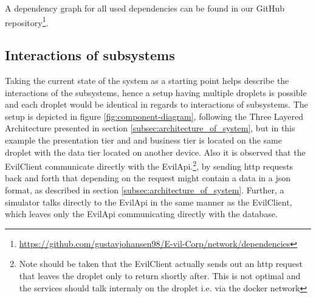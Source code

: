 \documentclass[report/main.tex]{subfiles}
\begin{document}
        A dependency graph for all used dependencies can be found in our GitHub repository\footnote{\hyperlink{Dependeny graph}{https://github.com/gustavjohansen98/E-vil-Corp/network/dependencies}}.

    \subsection{Interactions of subsystems}
        Taking the current state of the system as a starting point helps describe the interactions of the subsystems, hence a setup having multiple droplets is possible and each droplet would be identical in regards to interactions of subsystems. The setup is depicted in figure \ref{fig:component-diagram}, following the Three Layered Architecture presented in section \ref{subsec:architecture_of_system}, but in this example the presentation tier and and business tier is located on the same droplet with the data tier located on another device. Also it is observed that the EvilClient communicate directly with the EvilApi.\footnote{Note should be taken that the EvilClient actually sends out an http request that leaves the droplet only to return shortly after. This is not optimal and the services should talk internaly on the droplet i.e. via the docker network}, by sending http requests back and forth that depending on the request might contain a data in a json format, as described in section \ref{subsec:architecture_of_system}. Further, a simulator talks directly to the EvilApi in the same manner as the EvilClient, which leaves only the EvilApi communicating directly with the database.
\end{document}
